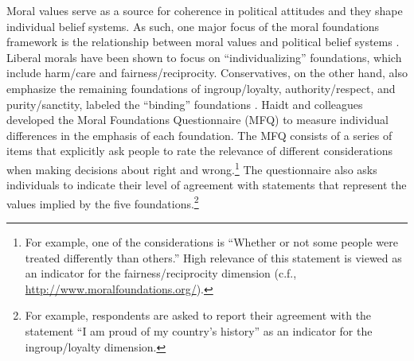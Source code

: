 \documentclass[12pt]{article}
\begin{document}
Moral values serve as a source for coherence in political attitudes and they shape individual belief systems. As such, one major focus of the moral foundations framework is the relationship between moral values and political belief systems \citep[c.f.,][]{haidt2012righteous}. Liberal morals have been shown to focus on ``individualizing'' foundations, which include harm/care and fairness/reciprocity. Conservatives, on the other hand, also emphasize the remaining foundations of ingroup/loyalty, authority/respect, and purity/sanctity, labeled the ``binding'' foundations \citep{haidt2007morality,graham2009liberals}. Haidt and colleagues developed the Moral Foundations Questionnaire (MFQ) to measure individual differences in the emphasis of each foundation. The MFQ consists of a series of items that explicitly ask people to rate the relevance of different considerations when making decisions about right and wrong.\footnote{For example, one of the considerations is ``Whether or not some people were treated differently than others.'' High relevance of this statement is viewed as an indicator for the fairness/reciprocity dimension (c.f., \url{http://www.moralfoundations.org/}).} The questionnaire also asks individuals to indicate their level of agreement with statements that represent the values implied by the five foundations.\footnote{For example, respondents are asked to report their agreement with the statement ``I am proud of my country's history'' as an indicator for the ingroup/loyalty dimension.}
\end{document}
